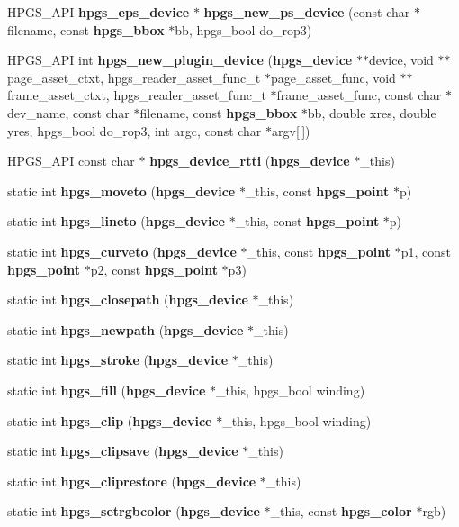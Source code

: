 \begin{DoxyCompactItemize}
\item 
HPGS\_\-API {\bf hpgs\_\-eps\_\-device} $\ast$ {\bf hpgs\_\-new\_\-ps\_\-device} (const char $\ast$filename, const {\bf hpgs\_\-bbox} $\ast$bb, hpgs\_\-bool do\_\-rop3)
\item 
HPGS\_\-API int {\bfseries hpgs\_\-new\_\-plugin\_\-device} ({\bf hpgs\_\-device} $\ast$$\ast$device, void $\ast$$\ast$page\_\-asset\_\-ctxt, hpgs\_\-reader\_\-asset\_\-func\_\-t $\ast$page\_\-asset\_\-func, void $\ast$$\ast$frame\_\-asset\_\-ctxt, hpgs\_\-reader\_\-asset\_\-func\_\-t $\ast$frame\_\-asset\_\-func, const char $\ast$dev\_\-name, const char $\ast$filename, const {\bf hpgs\_\-bbox} $\ast$bb, double xres, double yres, hpgs\_\-bool do\_\-rop3, int argc, const char $\ast$argv[$\,$])\label{group__device_ga32a98f875a08a2a1e5a511ee3f51c5f9}

\item 
HPGS\_\-API const char $\ast$ {\bf hpgs\_\-device\_\-rtti} ({\bf hpgs\_\-device} $\ast$\_\-this)
\item 
static int {\bf hpgs\_\-moveto} ({\bf hpgs\_\-device} $\ast$\_\-this, const {\bf hpgs\_\-point} $\ast$p)
\item 
static int {\bf hpgs\_\-lineto} ({\bf hpgs\_\-device} $\ast$\_\-this, const {\bf hpgs\_\-point} $\ast$p)
\item 
static int {\bf hpgs\_\-curveto} ({\bf hpgs\_\-device} $\ast$\_\-this, const {\bf hpgs\_\-point} $\ast$p1, const {\bf hpgs\_\-point} $\ast$p2, const {\bf hpgs\_\-point} $\ast$p3)
\item 
static int {\bf hpgs\_\-closepath} ({\bf hpgs\_\-device} $\ast$\_\-this)
\item 
static int {\bf hpgs\_\-newpath} ({\bf hpgs\_\-device} $\ast$\_\-this)
\item 
static int {\bf hpgs\_\-stroke} ({\bf hpgs\_\-device} $\ast$\_\-this)
\item 
static int {\bf hpgs\_\-fill} ({\bf hpgs\_\-device} $\ast$\_\-this, hpgs\_\-bool winding)
\item 
static int {\bf hpgs\_\-clip} ({\bf hpgs\_\-device} $\ast$\_\-this, hpgs\_\-bool winding)
\item 
static int {\bf hpgs\_\-clipsave} ({\bf hpgs\_\-device} $\ast$\_\-this)
\item 
static int {\bf hpgs\_\-cliprestore} ({\bf hpgs\_\-device} $\ast$\_\-this)
\item 
static int {\bf hpgs\_\-setrgbcolor} ({\bf hpgs\_\-device} $\ast$\_\-this, const {\bf hpgs\_\-color} $\ast$rgb)
\item 

\end{DoxyCompactItemize}
